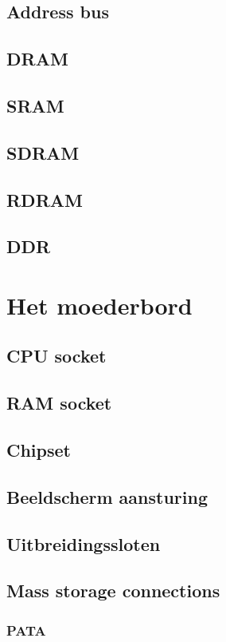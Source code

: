 \documentclass[a4paper,12pt,twoside,openright,titlepage]{book}
\begin{document}
\section{Address bus}
\section{DRAM}
\section{SRAM}
\section{SDRAM}
\section{RDRAM}
\section{DDR}

\chapter{Het moederbord}
\section{CPU socket}
\section{RAM socket}
\section{Chipset}
\section{Beeldscherm aansturing}
\section{Uitbreidingssloten}
\section{Mass storage connections}
\subsection{PATA}
\end{document}
